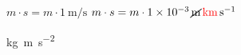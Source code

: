 \documentclass[border=10pt]{article}
\begin{document}
\( m \cdot s = m \cdot \qty{1}{\m\per\s} \)
\( m \cdot s = m \cdot \qty{1e-3}{\cancel\m\highlight{red}\km\per\s} \)

\unit{\kilo\gram\meter\per\square\second}
\end{document}
